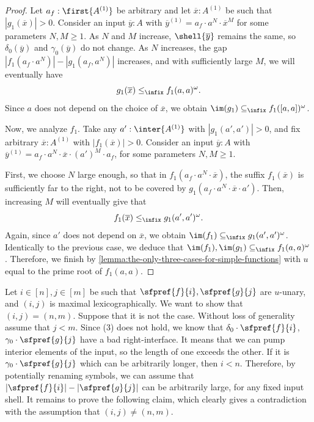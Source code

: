 \begin{proof}
    Let $a_f : \first{A^{(1)}}$ be arbitrary and let $\overline x : A^{(1)}$ be such that $|g_1(\overline x)| > 0$. Consider an input $\overline y : A$ with $\overline y^{(1)} = a_f \cdot a^N \cdot \overline x^M$ for some parameters $N,M \geq 1$. As $N$ and $M$ increase, $\shell{\overline y}$ remains the same, so $\delta_0(\overline y)$ and $\gamma_0(\overline y)$ do not change. As $N$ increases, the gap $|f_1(a_f \cdot  a^N)| - |g_1(a_f, a^N)|$ increases, and with sufficiently large $M$, we will eventually have
    \[
        g_1(\overline x) \leq_\infix f_1(a,a)^\omega.
    \]
    Since $a$ does not depend on the choice of $\overline x$, we obtain $\im(g_1) \subseteq_\infix f_1([a,a])^\omega$.
    
    Now, we analyze $f_1$. Take any $a' : \inter{A^{(1)}}$ with $|g_1(a',a')| > 0$, and fix arbitrary $\overline x : A^{(1)}$ with $|f_1(\overline x)| > 0$. Consider an input $\overline y : A$ with $\overline y^{(1)} = a_f \cdot a^N \cdot \overline x \cdot (a')^M \cdot a_f$, for some parameters $N,M \geq 1$.
    
    First, we choose $N$ large enough, so that in $f_1(a_f \cdot  a^N \cdot \overline x)$, the suffix $f_1(\overline x)$ is sufficiently far to the right, not to be covered by $g_1(a_f \cdot a^N \cdot \overline x \cdot a')$. Then, increasing $M$ will eventually give that
    \[
        f_1(\overline x) \leq_\infix g_1(a',a')^\omega.
    \]
    Again, since $a'$ does not depend on $\overline x$, we obtain $\im(f_1) \subseteq_\infix g_1(a', a')^\omega$. Identically to the previous case, we deduce that $\im(f_1),\im(g_1) \subseteq_\infix f_1(a,a)^\omega$. Therefore, we finish by \cref{lemma:the-only-three-cases-for-simple-functions} with $u$ equal to the prime root of $f_1(a,a)$.
\end{proof}

Let $i \in [n], j \in [m]$ be such that $\sfpref{f}{i}, \sfpref{g}{j}$ are $u$-unary, and $(i,j)$ is maximal lexicographically. We want to show that $(i,j) = (n,m)$. Suppose that it is not the case. Without loss of generality assume that $j < m$. Since (3) does not hold, we know that $\delta_0 \cdot \sfpref{f}{i}$, $\gamma_0 \cdot \sfpref{g}{j}$ have a bad right-interface. It means that we can pump interior elements of the input, so the length of one exceeds the other. If it is $\gamma_0 \cdot \sfpref{g}{j}$ which can be arbitrarily longer, then $i < n$. Therefore, by potentially renaming symbols, we can assume that $|\sfpref{f}{i}| - |\sfpref{g}{j}|$ can be arbitrarily large, for any fixed input shell. It remains to prove the following claim, which clearly gives a contradiction with the assumption that $(i,j) \neq (n,m)$.

